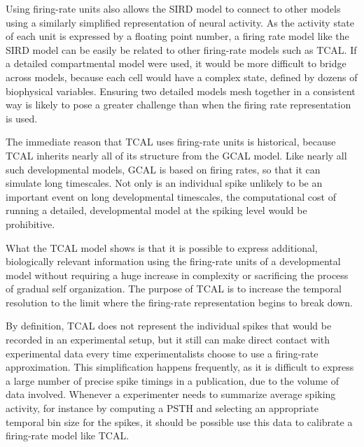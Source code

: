 \documentclass[phd,ianc,twoside]{infthesis}
\begin{document}
Using firing-rate units also allows the SIRD model to connect to other models
using a similarly simplified representation of neural activity. As the
activity state of each unit is expressed by a floating point number, a
firing rate model like the SIRD model can be easily be related to other
firing-rate models such as TCAL. If a detailed compartmental model were
used, it would be more difficult to bridge across models, because each cell
would have a complex state, defined by dozens of biophysical
variables. Ensuring two detailed models mesh together in a consistent way
is likely to pose a greater challenge than when the firing rate
representation is used.

The immediate reason that TCAL uses firing-rate units is historical,
because TCAL inherits nearly all of its structure from the GCAL
model. Like nearly all such developmental models, GCAL is based on
firing rates, so that it can simulate long timescales. Not only
is an individual spike unlikely to be an important event on long
developmental timescales, the computational cost of running a detailed,
developmental model at the spiking level would be prohibitive.

What the TCAL model shows is that it is possible to express additional,
biologically relevant information using the firing-rate units of a
developmental model without requiring a huge increase in complexity or
sacrificing the process of gradual self organization. The purpose of
TCAL is to increase the temporal resolution to the limit where the
firing-rate representation begins to break down.

By definition, TCAL does not represent the individual spikes that would be 
recorded in an experimental setup, but it still can make direct contact with
experimental data every time experimentalists choose to use a firing-rate
approximation. This simplification happens frequently, as it is difficult to
express a large number of precise spike timings in a publication, due to
the volume of data involved.  Whenever a experimenter needs to
summarize average spiking activity, for instance by computing a PSTH and
selecting an appropriate temporal bin size for the spikes, it should be
possible use this data to calibrate a firing-rate model like TCAL.
\end{document}
